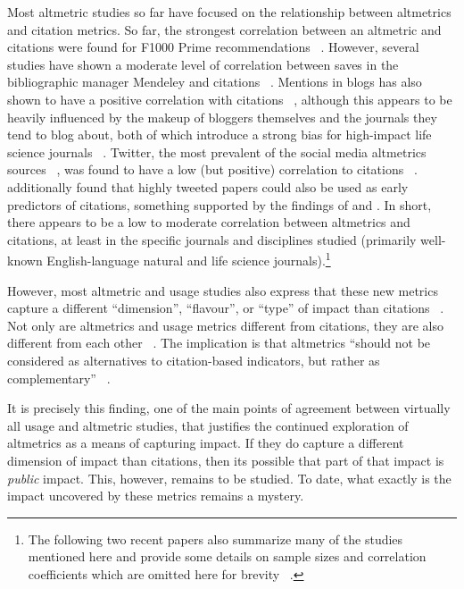 Most altmetric studies so far have focused on the relationship between altmetrics and citation metrics. So far, the strongest correlation between an altmetric and citations were found for F1000 Prime recommendations ~\citep{Li2012}. However, several studies have shown a moderate level of correlation between saves in the bibliographic manager Mendeley and citations ~\citep{Li2012a,Priem2012,Bar-Ilan2012,Bar-Ilan2012a}. Mentions in blogs has also shown to have a positive correlation with citations ~\citep{Fausto2012b,Costas2014}, although this appears to be heavily influenced by the makeup of bloggers themselves and the journals they tend to blog about, both of which introduce a strong bias for high-impact life science journals ~\citep{Shema2012}. Twitter, the most prevalent of the social media altmetrics sources ~\citep{Thelwall2013c}, was found to have a low (but positive) correlation to citations ~\citep{Haustein2013,Eysenbach2011}.  \citet{Eysenbach2011} additionally found that highly tweeted papers could also be used as early predictors of citations, something supported by the findings of  \citet{Shuai2012a} and  \citet{Thelwall2013c}. In short, there appears to be a low to moderate correlation between altmetrics and citations, at least in the specific journals and disciplines studied (primarily well-known English-language natural and life science journals).\footnote{The following two recent papers also summarize many of the studies mentioned here and provide some details on sample sizes and correlation coefficients which are omitted here for brevity ~\citep{Haustein2013,Torres-Salinas2013}.}

However, most altmetric and usage studies also express that these new metrics capture a different ``dimension'', ``flavour'', or ``type'' of impact than citations ~\citep{Torres-Salinas2013,Costas2014,Haustein2013,Eysenbach2011,Bollen2008a,Bollen2009}. Not only are altmetrics and usage metrics different from citations, they are also different from each other ~\citep{Thelwall2013c,Bollen2009}. The implication is that altmetrics ``should not be considered as alternatives to citation-based indicators, but rather as complementary'' ~\citep[pp. 18--19]{Haustein2014b}.

It is precisely this finding, one of the main points of agreement between virtually all usage and altmetric studies, that justifies the continued exploration of altmetrics as a means of capturing impact. If they do capture a different dimension of impact than citations, then its possible that part of that impact is \emph{public} impact. This, however, remains to be studied. To date, what exactly is the impact uncovered by these metrics remains a mystery.

